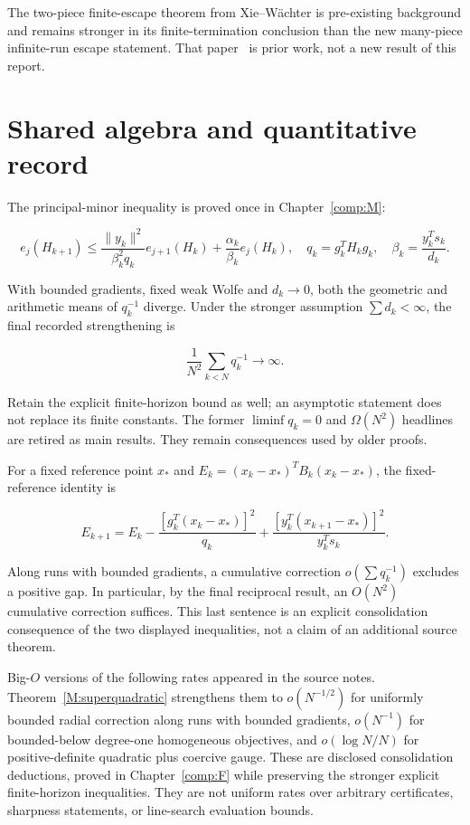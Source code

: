 The two-piece finite-escape theorem from Xie--Wächter is pre-existing background and remains stronger in its finite-termination conclusion than the new many-piece infinite-run escape statement. That paper~\cite{XW} is prior work, not a new result of this report.



\section{Shared algebra and quantitative record}\label{shared-algebra-and-quantitative-record}

The principal-minor inequality is proved once in Chapter~\ref{comp:M}:

\[e_j(H_{k+1})\le
\frac{\|y_k\|^2}{\beta_k^2q_k}e_{j+1}(H_k)
+\frac{\alpha_k}{\beta_k}e_j(H_k),\quad
q_k=g_k^TH_kg_k,\quad\beta_k=\frac{y_k^Ts_k}{d_k}.\]

With bounded gradients, fixed weak Wolfe and \(d_k\to0\), both the geometric and arithmetic means of \(q_k^{-1}\) diverge. Under the stronger assumption \(\sum d_k<\infty\), the final recorded strengthening is

\[\boxed{\frac1{N^2}\sum_{k<N}q_k^{-1}\to\infty.}\]

Retain the explicit finite-horizon bound as well; an asymptotic statement does not replace its finite constants. The former \(\liminf q_k=0\) and \(\Omega(N^2)\) headlines are retired as main results. They remain consequences used by older proofs.

For a fixed reference point \(x_*\) and \(E_k=(x_k-x_*)^TB_k(x_k-x_*)\), the fixed-reference identity is

\[E_{k+1}=E_k-\frac{[g_k^T(x_k-x_*)]^2}{q_k}
+\frac{[y_k^T(x_{k+1}-x_*)]^2}{y_k^Ts_k}.\]

Along runs with bounded gradients, a cumulative correction \(o(\sum q_k^{-1})\) excludes a positive gap. In particular, by the final reciprocal result, an \(O(N^2)\) cumulative correction suffices. This last sentence is an explicit consolidation consequence of the two displayed inequalities, not a claim of an additional source theorem.

Big-\(O\) versions of the following rates appeared in the source notes. Theorem~\ref{M:superquadratic} strengthens them to \(o(N^{-1/2})\) for uniformly bounded radial correction along runs with bounded gradients, \(o(N^{-1})\) for bounded-below degree-one homogeneous objectives, and \(o(\log N/N)\) for positive-definite quadratic plus coercive gauge. These are disclosed consolidation deductions, proved in Chapter~\ref{comp:F} while preserving the stronger explicit finite-horizon inequalities. They are not uniform rates over arbitrary certificates, sharpness statements, or line-search evaluation bounds.

